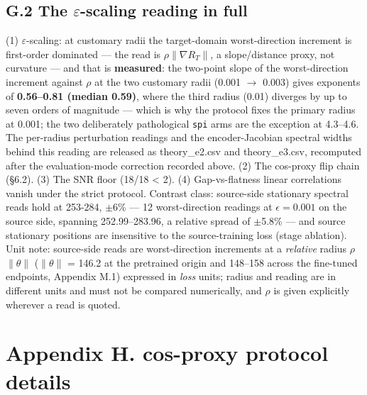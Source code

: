 \documentclass[pdflatex,sn-mathphys-ay]{sn-jnl}
\begin{document}
\subsection*{G.2 The \ensuremath{\varepsilon}-scaling reading in full}

(1) \ensuremath{\varepsilon}-scaling: at customary radii the target-domain worst-direction increment is first-order dominated --- the read is $\rho\|\nabla R_T\|$, a slope/distance proxy, not curvature --- and that is \textbf{measured}: the two-point slope of the worst-direction increment against \ensuremath{\rho} at the two customary radii (0.001 \ensuremath{\rightarrow} 0.003) gives exponents of \textbf{0.56--0.81 (median 0.59)}, where the third radius (0.01) diverges by up to seven orders of magnitude --- which is why the protocol fixes the primary radius at 0.001; the two deliberately pathological \texttt{spi} arms are the exception at 4.3--4.6. The per-radius perturbation readings and the encoder-Jacobian spectral widths behind this reading are released as theory\_e2.csv and theory\_e3.csv, recomputed after the evaluation-mode correction recorded above. (2) The cos-proxy flip chain (\S{}6.2). (3) The SNR floor (18/18 \textless{} 2). (4) Gap-vs-flatness linear correlations vanish under the strict protocol. Contrast class: source-side stationary spectral reads hold at 253-284, \ensuremath{\pm}6\% --- 12 worst-direction readings at $\epsilon = 0.001$ on the source side, spanning 252.99--283.96, a relative spread of \ensuremath{\pm}5.8\% --- and source stationary positions are insensitive to the source-training loss (stage ablation). Unit note: source-side reads are worst-direction increments at a \emph{relative} radius \ensuremath{\rho}\ensuremath{\|}\ensuremath{\theta}\ensuremath{\|} (\ensuremath{\|}\ensuremath{\theta}\ensuremath{\|} = 146.2 at the pretrained origin and 148--158 across the fine-tuned endpoints, Appendix M.1) expressed in \emph{loss} units; radius and reading are in different units and must not be compared numerically, and \ensuremath{\rho} is given explicitly wherever a read is quoted.

\section*{Appendix H. cos-proxy protocol details}
\end{document}
